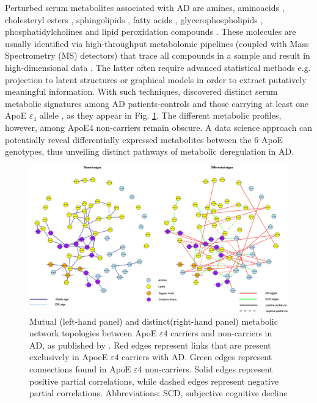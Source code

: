 \documentclass{amsart}
\theoremstyle{plain}
\begin{document}
Perturbed serum metabolites associated with AD are amines, aminoacids \cite{deLeeuw2017Blood-basedDisease, Green2023InvestigatingDisease}, cholesteryl esters \cite{Proitsi2017AssociationAnalysis}, sphingolipids \cite{Varma2018BrainStudy,Sun2022AssociationDisease,Green2023InvestigatingDisease,Oeckl2019ADisease,Barupal2019SetsPathophysiology}, fatty acids \cite{Fernandez-Calle2022APOEDiseases,deLeeuw2017Blood-basedDisease}, glycerophospholipids \cite{Varma2018BrainStudy, Jia2022ATypes,Huo2020BrainAnalysis, Weng2019TheImpairment}, phosphatidylcholines \cite{Simpson2016BloodAging} and lipid peroxidation compounds \cite{Fernandez-Calle2022APOEDiseases}. These molecules are usually identified via high-throughput metabolomic pipelines (coupled with Mass Spectrometry (MS) detectors) that trace all compounds in a sample and result in high-dimensional data \cite{Oka2023MultiomicsCohort}. The latter often require advanced statistical methods e.g. projection to latent structures \cite{Weng2019TheImpairment, Peeters2019StableData} or graphical models \cite{Peeters2022Rags2ridges:Matrices} in order to extract putatively meaningful information. 
With such techniques, \citeauthor{deLeeuw2017Blood-basedDisease} discovered distinct serum metabolic signatures among AD patients-controls and those carrying at least one ApoE $\varepsilon_4$ allele \cite{deLeeuw2017Blood-basedDisease}, as they appear in Fig. \ref{fig2}. The different metabolic profiles, however, among ApoE4 non-carriers remain obscure. A data science approach can potentially reveal differentially expressed metabolites between the 6 ApoE genotypes, thus unveiling distinct pathways of metabolic deregulation in AD.

\begin{figure}[b!]
\vspace*{-1cm}
  \includegraphics[width=\textwidth]{figures/network.jpeg}
    \caption{Mutual (left-hand panel) and distinct(right-hand panel) metabolic network topologies between ApoE $\varepsilon4$ carriers and non-carriers in AD, as published by \citeauthor{deLeeuw2017Blood-basedDisease}. Red edges represent links that are present exclusively in ApoeE $\varepsilon4$ carriers with AD. Green edges represent connections found in ApoE $\varepsilon4$ non-carriers. Solid edges represent positive partial correlations, while dashed edges represent negative partial correlations. Abbreviations: SCD, subjective cognitive decline }
  \label{fig2}
\end{figure}
\end{document}
